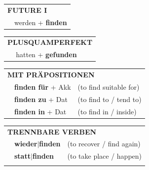 \documentclass[10pt,a4paper]{revtex4-2}
\begin{document}
\begin{verbbox-acc}
\begin{tabular}{rl}
    \multicolumn{2}{l}{\textbf{FUTURE I} }\\
  &  werden + \textbf{finden}\\
 
  \end{tabular}
\hfill
   \begin{tabular}{rl}
      \multicolumn{2}{l}{\textbf{PLUSQUAMPERFEKT}}\\
   & hatten + \textbf{gefunden}\\
  \end{tabular}
  
   \vspace{10pt}

\begin{tabular}{lll}
      \multicolumn{3}{l}{\textbf{MIT PRÄPOSITIONEN}}\\
& \textbf{finden für} + Akk & (to find suitable for)\\
& \textbf{finden zu} + Dat & (to find to / tend to)\\
& \textbf{finden in} + Dat & (to find in / inside)\\
\end{tabular}
  \hfill
\begin{tabular}{lll}
      \multicolumn{3}{l}{\textbf{TRENNBARE VERBEN}}\\
 & \textbf{wieder$|$finden} & (to recover / find again)\\
 & \textbf{statt$|$finden} & (to take place / happen)\\
\vspace{10pt}
  \end{tabular}

  \vspace{-5pt}

\end{verbbox-acc}
\end{document}
